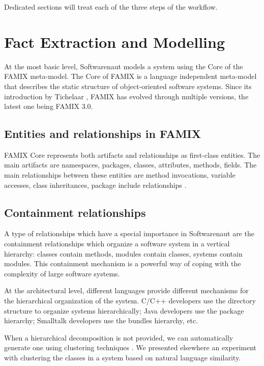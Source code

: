 \documentclass[preprint,12pt]{elsarticle}
\begin{document}
Dedicated sections will treat each of the three steps of the workflow.




\newpage
\section {Fact Extraction and Modelling}
\label{sec:facts}


At the most basic level, Softwarenaut models a system using the Core of the FAMIX meta-model. The Core of FAMIX is a language independent meta-model that describes the static structure of object-oriented software systems. Since its introduction by Tichelaar \cite{tichelaar-thesis}, FAMIX has evolved through multiple versions, the latest one being FAMIX 3.0. 




\subsection {Entities and relationships in FAMIX}
FAMIX Core represents both artifacts and relationships as first-class entities. The main artifacts are namespaces, packages, classes, attributes, methods, fields. The main relationships between these entities are method invocations, variable accesses, class inheritances, package include relationships \cite{tichelaar-thesis}.

\subsection {Containment relationships}
A type of relationships which have a special importance in Softwarenaut are the containment relationships which organize a software system in a vertical hierarchy: classes contain methods, modules contain classes, systems contain modules. This containment mechanism is a powerful way of coping with the complexity of large software systems.

At the architectural level, different languages provide different mechanisms for the hierarchical organization of the system. C/C++ developers use the directory structure to organize systems hierarchically; Java developers use the package hierarchy; Smalltalk developers use the bundles hierarchy, etc. 

When a hierarchical decomposition is not provided, we can automatically generate one using clustering techniques \cite{koschke-thesis}. We presented elsewhere an experiment with clustering the classes in a system based on natural language similarity\cite{Lung05a}.
\end{document}
